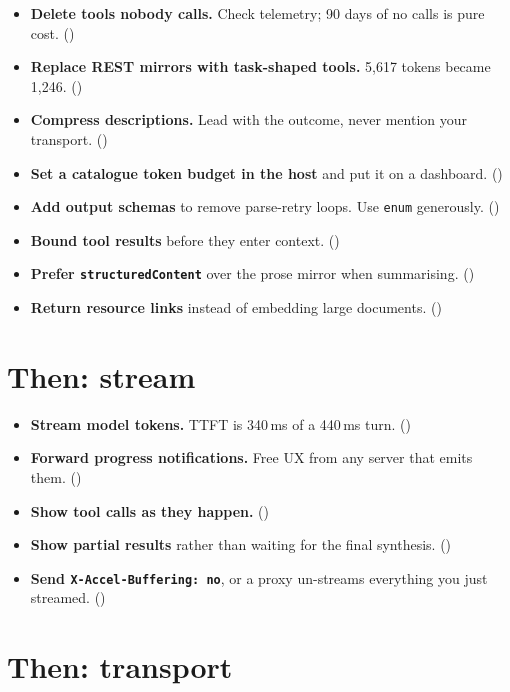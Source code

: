 \begin{itemize}[leftmargin=1.6em, itemsep=3pt]
\item[$\square$] \textbf{Delete tools nobody calls.} Check telemetry; 90 days of
no calls is pure cost. ()
\item[$\square$] \textbf{Replace REST mirrors with task-shaped tools.} 5,617
tokens became 1,246. ()
\item[$\square$] \textbf{Compress descriptions.} Lead with the outcome, never
mention your transport. ()
\item[$\square$] \textbf{Set a catalogue token budget in the host} and put it on
a dashboard. ()
\item[$\square$] \textbf{Add output schemas} to remove parse-retry loops. Use
\texttt{enum} generously. ()
\item[$\square$] \textbf{Bound tool results} before they enter context.
()
\item[$\square$] \textbf{Prefer \texttt{structuredContent}} over the prose
mirror when summarising. ()
\item[$\square$] \textbf{Return resource links} instead of embedding large
documents. ()
\end{itemize}

\section{Then: stream}

\begin{itemize}[leftmargin=1.6em, itemsep=3pt]
\item[$\square$] \textbf{Stream model tokens.} TTFT is 340\,ms of a 440\,ms turn.
()
\item[$\square$] \textbf{Forward progress notifications.} Free UX from any server
that emits them. ()
\item[$\square$] \textbf{Show tool calls as they happen.} ()
\item[$\square$] \textbf{Show partial results} rather than waiting for the final
synthesis. ()
\item[$\square$] \textbf{Send \texttt{X-Accel-Buffering: no}}, or a proxy
un-streams everything you just streamed. ()
\end{itemize}

\section{Then: transport}

